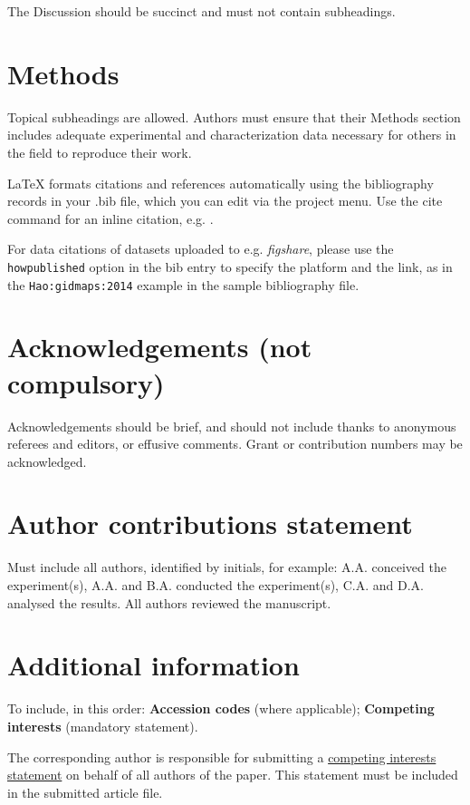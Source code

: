 \documentclass[fleqn,10pt]{wlscirep}
\begin{document}
The Discussion should be succinct and must not contain subheadings.

\section*{Methods}

Topical subheadings are allowed. Authors must ensure that their Methods section includes adequate experimental and characterization data necessary for others in the field to reproduce their work.



\noindent LaTeX formats citations and references automatically using the bibliography records in your .bib file, which you can edit via the project menu. Use the cite command for an inline citation, e.g.  \cite{Hao:gidmaps:2014}.

For data citations of datasets uploaded to e.g. \emph{figshare}, please use the \verb|howpublished| option in the bib entry to specify the platform and the link, as in the \verb|Hao:gidmaps:2014| example in the sample bibliography file.

\section*{Acknowledgements (not compulsory)}

Acknowledgements should be brief, and should not include thanks to anonymous referees and editors, or effusive comments. Grant or contribution numbers may be acknowledged.

\section*{Author contributions statement}

Must include all authors, identified by initials, for example:
A.A. conceived the experiment(s),  A.A. and B.A. conducted the experiment(s), C.A. and D.A. analysed the results.  All authors reviewed the manuscript. 

\section*{Additional information}

To include, in this order: \textbf{Accession codes} (where applicable); \textbf{Competing interests} (mandatory statement). 

The corresponding author is responsible for submitting a \href{http://www.nature.com/srep/policies/index.html#competing}{competing interests statement} on behalf of all authors of the paper. This statement must be included in the submitted article file.
\end{document}
